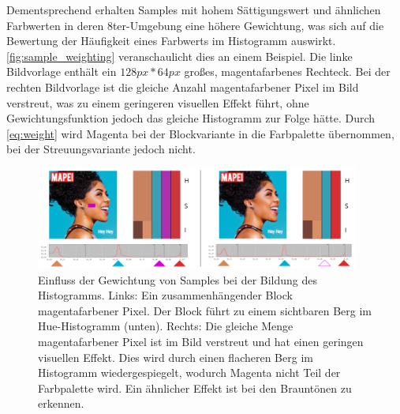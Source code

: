 Dementsprechend erhalten Samples mit hohem Sättigungswert und ähnlichen Farbwerten in deren 8ter-Umgebung eine höhere Gewichtung, was sich auf die Bewertung der Häufigkeit eines Farbwerts im Histogramm auswirkt. \autoref{fig:sample_weighting} veranschaulicht dies an einem Beispiel. Die linke Bildvorlage enthält ein $128px*64px$ großes, magentafarbenes Rechteck. Bei der rechten Bildvorlage ist die gleiche Anzahl magentafarbener Pixel im Bild verstreut, was zu einem geringeren visuellen Effekt führt, ohne Gewichtungsfunktion jedoch das gleiche Histogramm zur Folge hätte. Durch \autoref{eq:weight} wird Magenta bei der Blockvariante in die Farbpalette übernommen, bei der Streuungsvariante jedoch nicht.

\begin{figure}[h]
\centering
\includegraphics[width=0.95\textwidth]{img/sample_weighting.png}
\caption{Einfluss der Gewichtung von Samples bei der Bildung des Histogramms. Links: Ein zusammenhängender Block magentafarbener Pixel. Der Block führt zu einem sichtbaren Berg im Hue-Histogramm (unten). Rechts: Die gleiche Menge magentafarbener Pixel ist im Bild verstreut und hat einen geringen visuellen Effekt. Dies wird durch einen flacheren Berg im Histogramm wiedergespiegelt, wodurch Magenta nicht Teil der Farbpalette wird. Ein ähnlicher Effekt ist bei den Brauntönen zu erkennen.}
\label{fig:sample_weighting}
\end{figure}